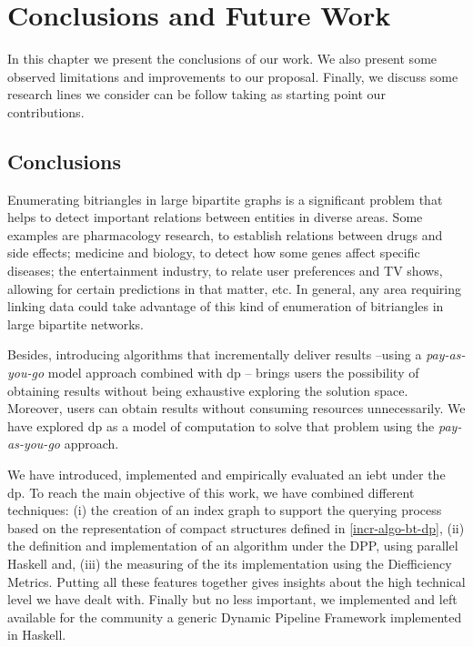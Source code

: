 \chapter{Conclusions and Future Work}\label{conclusions}
In this chapter we present the conclusions of our work.  We also present some observed limitations and  improvements to our proposal. Finally, we discuss  some  research lines we consider can be follow taking as starting  point our contributions.


\section{Conclusions}
Enumerating bitriangles in large bipartite graphs is a significant problem that helps to detect important relations between entities in  diverse areas. Some examples are pharmacology research, to establish relations between drugs and side effects; medicine and biology, to detect how some genes affect specific diseases; the entertainment industry, to relate  user preferences and TV shows, allowing for certain predictions in that matter, etc.  In general, any area requiring linking data could take advantage of this kind of enumeration of  bitriangles in large bipartite networks. 

Besides, introducing algorithms that incrementally deliver results --using a \emph{pay-as-you-go} model approach combined with \acrshort{dp} -- brings users  the possibility of obtaining results  without being exhaustive exploring the solution space. Moreover, users can obtain results without consuming resources unnecessarily.
We have explored \acrlong{dp} as a model of computation to solve that problem using the \emph{pay-as-you-go} approach. 

We have introduced, implemented  and empirically evaluated an \acrlong{iebt} under the \acrlong{dp}. To reach the main objective of this work, we have combined different techniques: (i) the creation of an index graph to support the querying process based on the representation of compact structures defined in \autoref{incr-algo-bt-dp}, (ii) the definition and implementation of an algorithm under the DPP, using parallel Haskell and, (iii) the measuring of the its implementation using the Diefficiency Metrics. Putting all these features together gives insights about the high technical level we have dealt with. Finally but no less important, we implemented and left available for the community a generic Dynamic Pipeline Framework implemented in Haskell.

